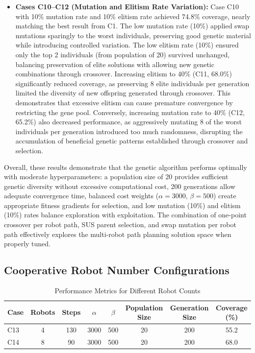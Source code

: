 \begin{itemize}
    \item \textbf{Cases C10–C12 (Mutation and Elitism Rate Variation):}
    Case C10 with 10\% mutation rate and 10\% elitism rate achieved 74.8\% coverage, nearly matching the best result from C1.
    The low mutation rate (10\%) applied swap mutations sparingly to the worst individuals, preserving good genetic material while introducing controlled variation.
    The low elitism rate (10\%) ensured only the top 2 individuals (from population of 20) survived unchanged, balancing preservation of elite solutions with allowing new genetic combinations through crossover.
    Increasing elitism to 40\% (C11, 68.0\%) significantly reduced coverage, as preserving 8 elite individuals per generation limited the diversity of new offspring generated through crossover. This demonstrates that excessive elitism can cause premature convergence by restricting the gene pool.
    Conversely, increasing mutation rate to 40\% (C12, 65.2\%) also decreased performance, as aggressively mutating 8 of the worst individuals per generation introduced too much randomness, disrupting the accumulation of beneficial genetic patterns established through crossover and selection.
\end{itemize}

Overall, these results demonstrate that the genetic algorithm performs optimally with moderate hyperparameters: a population size of 20 provides sufficient genetic diversity without excessive computational cost, 200 generations allow adequate convergence time, balanced cost weights ($\alpha=3000$, $\beta=500$) create appropriate fitness gradients for selection, and low mutation (10\%) and elitism (10\%) rates balance exploration with exploitation. The combination of one-point crossover per robot path, SUS parent selection, and swap mutation per robot path effectively explores the multi-robot path planning solution space when properly tuned.
\subsection{Cooperative Robot Number Configurations}
\begin{table}[H]
\centering
\caption{Performance Metrics for Different Robot Counts}
\begin{tabular}{@{}lccccccc@{}}
\toprule
\textbf{Case} & \textbf{Robots} & \textbf{Steps} & \textbf{$\alpha$} & \textbf{$\beta$} & \textbf{Population Size} & \textbf{Generation Size} & \textbf{Coverage (\%)} \\
\midrule
C13 & 4 & 130 & 3000 & 500 & 20 & 200 & 55.2 \\
C14 & 8 & 90 & 3000 & 500 & 20 & 200 & 68.0 \\
\bottomrule
\end{tabular}
\label{tab:ga_robots}
\end{table}
